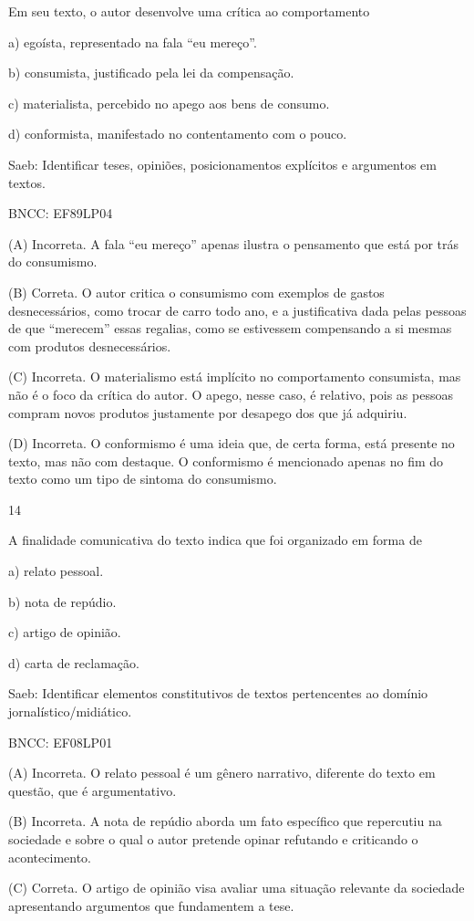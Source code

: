 Em seu texto, o autor desenvolve uma crítica ao comportamento

a) egoísta, representado na fala ``eu mereço''.

b) consumista, justificado pela lei da compensação.

c) materialista, percebido no apego aos bens de consumo.

d) conformista, manifestado no contentamento com o pouco.

Saeb: Identificar teses, opiniões, posicionamentos explícitos e
argumentos em textos.

BNCC: EF89LP04

(A) Incorreta. A fala ``eu mereço'' apenas ilustra o pensamento que está
por trás do consumismo.

(B) Correta. O autor critica o consumismo com exemplos de gastos
desnecessários, como trocar de carro todo ano, e a justificativa dada
pelas pessoas de que ``merecem'' essas regalias, como se estivessem
compensando a si mesmas com produtos desnecessários.

(C) Incorreta. O materialismo está implícito no comportamento
consumista, mas não é o foco da crítica do autor. O apego, nesse caso, é
relativo, pois as pessoas compram novos produtos justamente por desapego
dos que já adquiriu.

(D) Incorreta. O conformismo é uma ideia que, de certa forma, está
presente no texto, mas não com destaque. O conformismo é mencionado
apenas no fim do texto como um tipo de sintoma do consumismo.

\num{14}

A finalidade comunicativa do texto indica que foi organizado em forma de

a) relato pessoal.

b) nota de repúdio.

c) artigo de opinião.

d) carta de reclamação.

Saeb: Identificar elementos constitutivos de textos pertencentes ao
domínio jornalístico/midiático.

BNCC: EF08LP01

(A) Incorreta. O relato pessoal é um gênero narrativo, diferente do
texto em questão, que é argumentativo.

(B) Incorreta. A nota de repúdio aborda um fato específico que
repercutiu na sociedade e sobre o qual o autor pretende opinar refutando
e criticando o acontecimento.

(C) Correta. O artigo de opinião visa avaliar uma situação relevante da
sociedade apresentando argumentos que fundamentem a tese.

